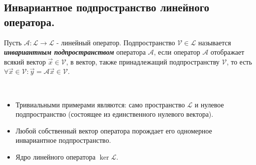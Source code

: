 \subsection{
    Инвариантное подпространство линейного оператора.
}

\begin{definition}
    Пусть $\mathscr{A} \colon \mathcal{L} \to \mathcal{L}$ - линейный оператор. Подпространство $\mathcal{V} \in \mathcal{L}$ называется \textbf{\textit{инвариантным подпространством}} оператора $\mathscr{A}$, если оператор $\mathscr{A}$ отображает всякий вектор $\vec{x} \in \mathcal{V}$, в вектор, также принадлежащий подпространству $\mathcal{V}$, то есть $\forall \vec{x} \in \mathcal{V} \colon \vec{y} = \mathscr{A}\vec{x} \in \mathcal{V}$.
\end{definition}

\begin{example}~

    \begin{itemize}
        \item Тривиальными примерами являются: само пространство $\mathcal{L}$ и нулевое подпространство (состоящее из единственного нулевого вектора).
        \item Любой собственный вектор оператора порождает его одномерное инвариантное подпространство.
        \item Ядро линейного оператора $\ker \mathcal{L}$. 
    \end{itemize}
\end{example}
